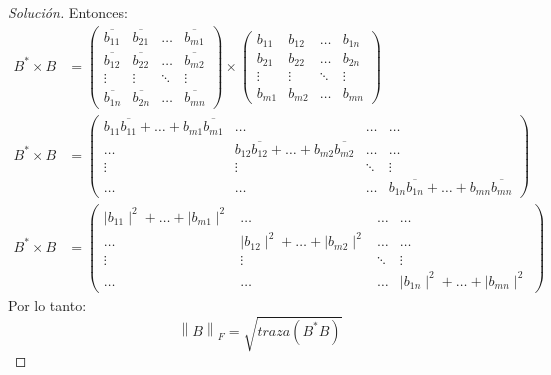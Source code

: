 \documentclass[12pt]{book}
\newcommand\norm[1]{\left\lVert#1\right\rVert}
\newenvironment{solucion}
  {\renewcommand\qedsymbol{$\square$}\begin{proof}[Solución]}
  {\end{proof}}
\begin{document}
\begin{solucion}
Entonces:
\begin{align*}
    B^* \times B &= \begin{pmatrix}
        \overline{b_{11}} & \overline{b_{21}} & \dots & \overline{b_{m1}}\\
        \overline{b_{12}} & \overline{b_{22}}& \dots & \overline{b_{m2}}\\
        \vdots & \vdots & \ddots & \vdots \\
        \overline{b_{1n}} & \overline{b_{2n}} & \dots & \overline{b_{mn}}
    \end{pmatrix} \times \begin{pmatrix}
        b_{11} & b_{12} & \dots & b_{1n}\\
        b_{21} & b_{22}& \dots & b_{2n}\\
        \vdots & \vdots & \ddots & \vdots\\
        b_{m1} &b_{m2}& \dots & b_{mn}
    \end{pmatrix} \\
    B^* \times B &= \begin{pmatrix}
        b_{11}\overline{b_{11}} + \dots + b_{m1}\overline{b_{m1}} & \dots & \dots & \dots \\
        \dots & b_{12}\overline{b_{12}}+\dots + b_{m2}\overline{b_{m2}}& \dots & \dots \\
        \vdots & \vdots & \ddots & \vdots\\
        \dots & \dots & \dots & b_{1n}\overline{b_{1n}} + \dots + b_{mn}\overline{b_{mn}}
    \end{pmatrix} \\
        B^* \times B &= \begin{pmatrix}
        \mid b_{11}\mid ^2 + \dots + \mid b_{m1} \mid ^2  & \dots & \dots & \dots \\
        \dots & \mid b_{12}\mid ^2+\dots + \mid b_{m2}\mid ^2& \dots & \dots \\
        \vdots & \vdots & \ddots & \vdots\\
        \dots & \dots & \dots & \mid b_{1n}\mid ^2 + \dots + \mid b_{mn}\mid ^2
    \end{pmatrix} 
\end{align*}
Por lo tanto:
    \[\norm{B}_F = \sqrt{traza(B^*B)}\]
\end{solucion}
\end{document}
